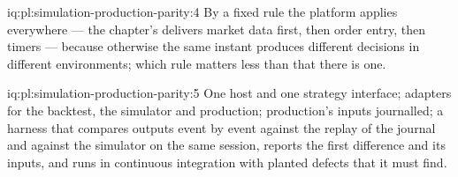 \begin{solution}{iq:pl:simulation-production-parity:4}
By a fixed rule the platform applies everywhere --- the chapter's delivers market data first, then order entry, then timers --- because
otherwise the same instant produces different decisions in different environments; which rule matters less than that there is one.
\end{solution}

\begin{solution}{iq:pl:simulation-production-parity:5}
One host and one strategy interface; adapters for the backtest, the simulator and production; production's inputs journalled; a harness that
compares outputs event by event against the replay of the journal and against the simulator on the same session, reports the first
difference and its inputs, and runs in continuous integration with planted defects that it must find.
\end{solution}
